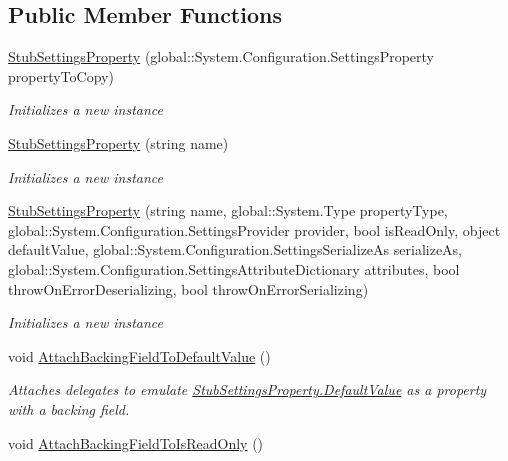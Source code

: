 \subsection*{Public Member Functions}
\begin{DoxyCompactItemize}
\item 
\hyperlink{class_system_1_1_configuration_1_1_fakes_1_1_stub_settings_property_adeb47f765c3ed05c0a5786c15a626840}{Stub\-Settings\-Property} (global\-::\-System.\-Configuration.\-Settings\-Property property\-To\-Copy)
\begin{DoxyCompactList}\small\item\em Initializes a new instance\end{DoxyCompactList}\item 
\hyperlink{class_system_1_1_configuration_1_1_fakes_1_1_stub_settings_property_acc0ea3bcc33a4c83d082a31b5d7d7b55}{Stub\-Settings\-Property} (string name)
\begin{DoxyCompactList}\small\item\em Initializes a new instance\end{DoxyCompactList}\item 
\hyperlink{class_system_1_1_configuration_1_1_fakes_1_1_stub_settings_property_a93d936f47d98adb9d9bc7ed189396b02}{Stub\-Settings\-Property} (string name, global\-::\-System.\-Type property\-Type, global\-::\-System.\-Configuration.\-Settings\-Provider provider, bool is\-Read\-Only, object default\-Value, global\-::\-System.\-Configuration.\-Settings\-Serialize\-As serialize\-As, global\-::\-System.\-Configuration.\-Settings\-Attribute\-Dictionary attributes, bool throw\-On\-Error\-Deserializing, bool throw\-On\-Error\-Serializing)
\begin{DoxyCompactList}\small\item\em Initializes a new instance\end{DoxyCompactList}\item 
void \hyperlink{class_system_1_1_configuration_1_1_fakes_1_1_stub_settings_property_a61c5893f78ac5d084b351a179f33bc1c}{Attach\-Backing\-Field\-To\-Default\-Value} ()
\begin{DoxyCompactList}\small\item\em Attaches delegates to emulate \hyperlink{class_system_1_1_configuration_1_1_fakes_1_1_stub_settings_property_a388540d1a766cb0ae903565134031373}{Stub\-Settings\-Property.\-Default\-Value} as a property with a backing field.\end{DoxyCompactList}\item 
void \hyperlink{class_system_1_1_configuration_1_1_fakes_1_1_stub_settings_property_ab79656014825c48b8e36341271083997}{Attach\-Backing\-Field\-To\-Is\-Read\-Only} ()

\end{DoxyCompactItemize}
